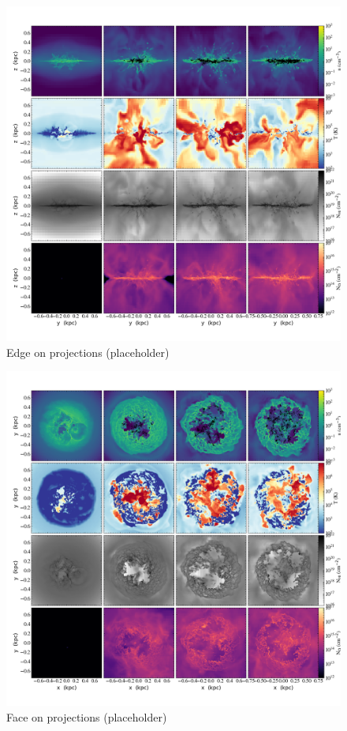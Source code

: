 \documentclass[twocolumn]{aastex61}
\begin{document}
\begin{figure}
\centering
\includegraphics[width=0.975\linewidth]{multiplot_4x4_x.png}
\caption{Edge on projections (placeholder)}
\label{fig:panel_x}
\end{figure}

\begin{figure}
\centering
\includegraphics[width=0.975\linewidth]{multiplot_4x4_z.png}
\caption{Face on projections (placeholder)}
\label{fig:panel_z}
\end{figure}
\end{document}
